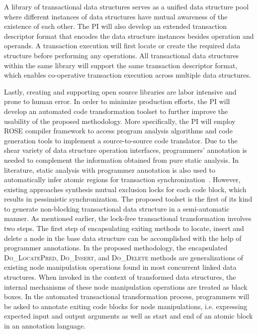 \documentclass{article}
\begin{document}
A library of transactional data structures serves as a unified data structure pool where different instances of data structures have mutual awareness of the existence of each other.
The PI will also develop an extended transaction descriptor format that encodes the data structure instances besides operation and operands.
A transaction execution will first locate or create the required data structure before performing any operations.
All transactional data structures within the same library will support the same transaction descriptor format, which enables co-operative transaction execution across multiple data structures.

Lastly, creating and supporting open source libraries are labor intensive and prone to human error.
In order to minimize production efforts, the PI will develop an automated code transformation toolset to further improve the usability of the proposed methodology.
More specifically, the PI will employ ROSE compiler framework to access program analysis algorithms and code generation tools to implement a source-to-source code translator.
Due to the shear variety of data structure operation interfaces, programmers' annotation is needed to complement the information obtained from pure static analysis.  
In literature, static analysis with programmer annotation is also used to automatically infer atomic regions for transaction synchronization~\cite{golan2015automatic}.
However, existing approaches synthesis mutual exclusion locks for each code block, which results in pessimistic synchronization.
The proposed toolset is the first of its kind to generate non-blocking transactional data structure in a semi-automatic manner. 
As mentioned earlier, the lock-free transactional transformation involves two steps.
The first step of encapsulating exiting methods to locate, insert and delete a node in the base data structure can be accomplished with the help of programmer annotations.
In the proposed methodology, the encapsulated \textsc{Do\_LocatePred}, \textsc{Do\_Insert}, and \textsc{Do\_Delete} methods are generalizations of existing node manipulation operations found in most concurrent linked data structures.
When invoked in the context of transformed data structures, the internal mechanisms of these node manipulation operations are treated as black boxes. 
In the automated transactional transformation process, programmers will be asked to annotate exiting code blocks for node manipulations, i.e. expressing expected input and output arguments as well as start and end of an atomic block in an annotation language.
\end{document}
